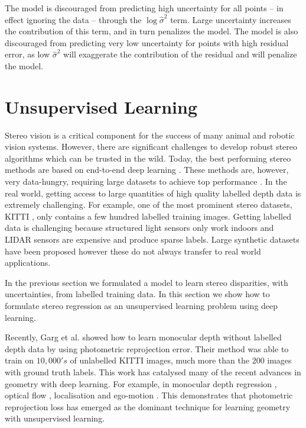 The model is discouraged from predicting high uncertainty for all points -- in effect ignoring the data -- through the $\log \hat{\sigma}^2$ term. Large uncertainty increases the contribution of this term, and in turn penalizes the model. The model is also discouraged from predicting very low uncertainty for points with high residual error, as low $\hat{\sigma}^2$ will exaggerate the contribution of the residual and will penalize the model.

\section{Unsupervised Learning}
\label{sec:unsupervised}

Stereo vision is a critical component for the success of many animal and robotic vision systems. However, there are significant challenges to develop robust stereo algorithms which can be trusted in the wild. 
Today, the best performing stereo methods are based on end-to-end deep learning \citep{zbontar2016stereo,luo2016efficient,kendall2017end,MIFDB16}. These methods are, however, very data-hungry, requiring large datasets to achieve top performance \citep{MIFDB16}. In the real world, getting access to large quantities of high quality labelled depth data is extremely challenging. For example, one of the most prominent stereo datasets, KITTI \citep{Geiger2012CVPR}, only contains a few hundred labelled training images. Getting labelled data is challenging because structured light sensors only work indoors and LIDAR sensors are expensive and produce sparse labels. Large synthetic datasets have been proposed \citep{MIFDB16} however these do not always transfer to real world applications.

In the previous section we formulated a model to learn stereo disparities, with uncertainties, from labelled training data. In this section we show how to formulate stereo regression as an unsupervised learning problem using deep learning. 

Recently, Garg et al. \citep{garg2016unsupervised} showed how to learn monocular depth without labelled depth data by using photometric reprojection error. Their method was able to train on $10,000's$ of unlabelled KITTI images, much more than the $200$ images with ground truth labels. This work has catalysed many of the recent advances in geometry with deep learning. For example, in monocular depth regression \citep{garg2016unsupervised,monodepth17}, optical flow \citep{jason2016back,ren2017unsupervised}, localisation \citep{kendall2017posenet} and ego-motion \citep{zhou2017unsupervised}. This demonstrates that photometric reprojection loss has emerged as the dominant technique for learning geometry with unsupervised learning.

